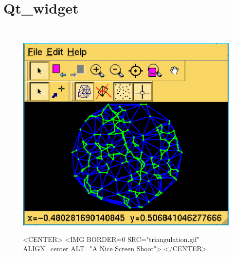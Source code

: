 
\newcommand{\qt}{{\em Qt}}      %

\gdef\lciIfHtmlClassLinks{\lcFalse}
\gdef\lciIfHtmlRefLinks{\lcFalse}
\gdef\lciIfHtmlLinks{\lcFalse}

\chapter{Qt\_widget}
\label{chapterQtwidget}

\\


\begin{figure}[h]
\begin{ccTexOnly}
\begin{center}
\includegraphics{triangulation.eps} 
\end{center}
\end{ccTexOnly}
\begin{ccHtmlOnly}
<CENTER>
<IMG BORDER=0 SRC="triangulation.gif"  ALIGN=center  ALT="A Nice Screen Shoot">
</CENTER>
\end{ccHtmlOnly}
\end{figure}
\begin{table}[h]
\end{table}

